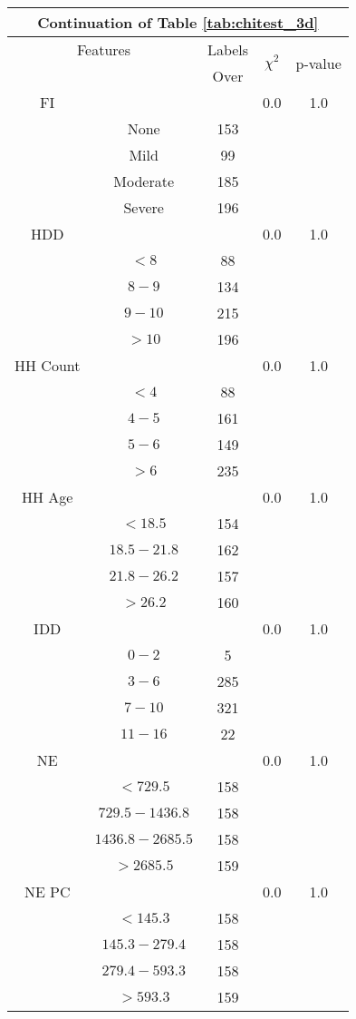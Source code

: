 \begin{table}
\centering
\label{tab:chitest_3d_cont}
\begin{tabular}{c c | c| c | c}
\hline
\multicolumn{5}{c}{Continuation of Table \ref{tab:chitest_3d}}\\ 
\hline
\multicolumn{2}{c|}{Features}& \multicolumn{1}{c|}{Labels}& \multirow{2}{*}{$\chi^2$} & \multirow{2}{*}{p-value}\\ 
& & Over & & \\ 
\hline
FI &  & & 0.0 & 1.0 \\ 
& None & 153& & \\ 
& Mild & 99& & \\ 
& Moderate & 185& & \\ 
& Severe & 196& & \\ 
\hline 
HDD &  & & 0.0 & 1.0 \\ 
& $< 8$ & 88& & \\ 
& $8-9$ & 134& & \\ 
& $9-10$ & 215& & \\ 
& $> 10$ & 196& & \\ 
\hline 
HH Count &  & & 0.0 & 1.0 \\ 
& $< 4$ & 88& & \\ 
& $4-5$ & 161& & \\ 
& $5-6$ & 149& & \\ 
& $> 6$ & 235& & \\ 
\hline 
HH Age &  & & 0.0 & 1.0 \\ 
& $< 18.5$ & 154& & \\ 
& $18.5-21.8$ & 162& & \\ 
& $21.8-26.2$ & 157& & \\ 
& $> 26.2$ & 160& & \\ 
\hline 
IDD &  & & 0.0 & 1.0 \\ 
& $0-2$ & 5& & \\ 
& $3-6$ & 285& & \\ 
& $7-10$ & 321& & \\ 
& $11-16$ & 22& & \\ 
\hline 
NE &  & & 0.0 & 1.0 \\ 
& $< 729.5$ & 158& & \\ 
& $729.5-1436.8$ & 158& & \\ 
& $1436.8-2685.5$ & 158& & \\ 
& $> 2685.5$ & 159& & \\ 
\hline 
NE PC &  & & 0.0 & 1.0 \\ 
& $< 145.3$ & 158& & \\ 
& $145.3-279.4$ & 158& & \\ 
& $279.4-593.3$ & 158& & \\ 
& $> 593.3$ & 159& & \\ 
\hline 
\end{tabular}
\end{table}

